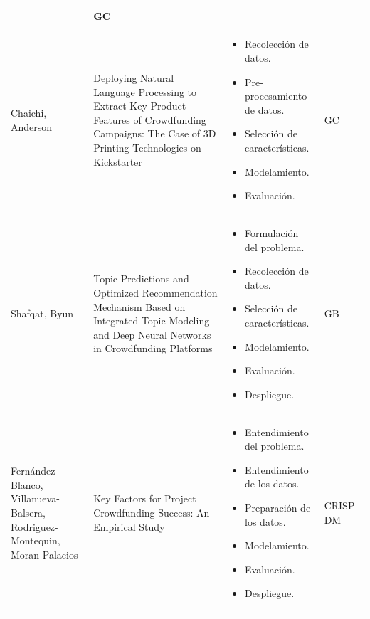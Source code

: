 \begin{longtable}{|M{3cm}|M{5.5cm}|M{5.5cm}|M{1.5cm}|}
			& GC
			\\
			\hline
			Chaichi, Anderson
			& Deploying Natural Language Processing to Extract Key Product Features of Crowdfunding Campaigns: The Case of 3D Printing Technologies on Kickstarter
			& 
			\begin{itemize}[noitemsep,leftmargin=*]
				\item Recolección de datos.
				\item Pre-procesamiento de datos.
				\item Selección de características.
				\item Modelamiento.
				\item Evaluación.
			\end{itemize}
			& GC
			\\
			\hline
			Shafqat, Byun
			& Topic Predictions and Optimized Recommendation Mechanism Based on Integrated Topic Modeling and Deep Neural Networks in Crowdfunding Platforms
			& 
			\begin{itemize}[noitemsep,leftmargin=*]
				\item Formulación del problema.
				\item Recolección de datos.
				\item Selección de características.
				\item Modelamiento.
				\item Evaluación.
				\item Despliegue.
			\end{itemize}
			& GB
			\\
			\hline
			Fernández-Blanco, Villanueva-Balsera, Rodriguez-Montequin, Moran-Palacios
			& Key Factors for Project Crowdfunding Success: An Empirical Study
			& 
			\begin{itemize}[noitemsep,leftmargin=*]
				\item Entendimiento del problema.
				\item Entendimiento de los datos.
				\item Preparación de los datos.
				\item Modelamiento.
				\item Evaluación.
				\item Despliegue.
			\end{itemize}
			& CRISP-DM
			\\
			\hline
		\end{longtable}%
	\endgroup

